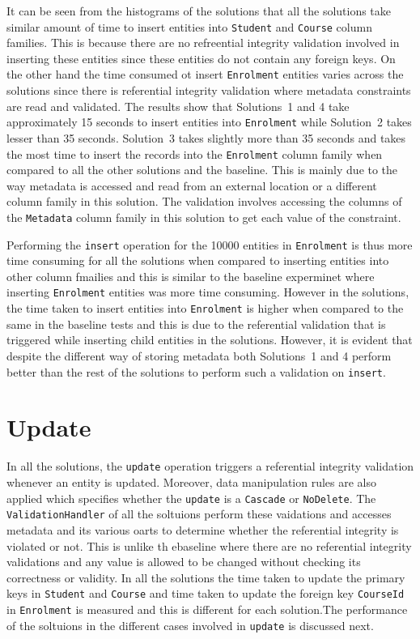 It can be seen from the histograms of the solutions that all the solutions take
similar amount of time to insert entities into \texttt{Student} and
\texttt{Course} column families. This is because there are no refreential
integrity validation involved in inserting these entities since these entities
do not contain any foreign keys. On the other hand the time consumed ot insert
\texttt{Enrolment} entities varies across the solutions since there is
referential integrity validation where metadata constraints are read and
validated.
The results show that Solutions~1 and 4 take approximately 15 seconds to insert
entities into \texttt{Enrolment} while Solution~2 takes lesser than 35 seconds. Solution~3
takes slightly more than 35 seconds and takes the most time to insert the
records into the \texttt{Enrolment} column family when compared to all the other
solutions and the baseline. This is mainly due to the way metadata is accessed
and read from an external location or a different column family in this
solution. The validation involves accessing the  columns of the
\texttt{Metadata} column family in this solution to get each value of the
constraint.
		
Performing the \texttt{insert} operation for the 10000 entities in
\texttt{Enrolment} is thus more time consuming for all the solutions when
compared to inserting entities into other column fmailies and this is similar to
the baseline experminet where inserting \texttt{Enrolment} entities was more
time consuming.
However in the solutions, the time taken to insert entities into
\texttt{Enrolment} is higher when compared to the same in the baseline tests and
this is  due to the referential validation that is triggered while inserting
child entities in the solutions. However, it is evident that despite the
different way of storing metadata both Solutions~1 and 4 perform better than the
rest of the solutions to perform such a validation on \texttt{insert}.
				
				
\section{Update}\label{sr:update}
In all the solutions, the \texttt{update} operation triggers a referential
integrity validation whenever an entity is updated. Moreover, data manipulation
rules are also applied which specifies whether the \texttt{update} is a
\texttt{Cascade} or \texttt{NoDelete}. The \texttt{ValidationHandler} of all the
soltuions perform these vaidations and accesses metadata and its various oarts
to determine whether the referential integrity is violated or not. This is
unlike th ebaseline where there are no referential integrity validations and any
value is allowed to be changed without checking its correctness or validity. In
all the solutions the time taken to update the primary keys in \texttt{Student}
and \texttt{Course} and time taken to update the foreign key \texttt{CourseId}
in \texttt{Enrolment} is measured and this is different for each solution.The
performance of the soltuions in the different cases involved in \texttt{update}
is discussed next.

